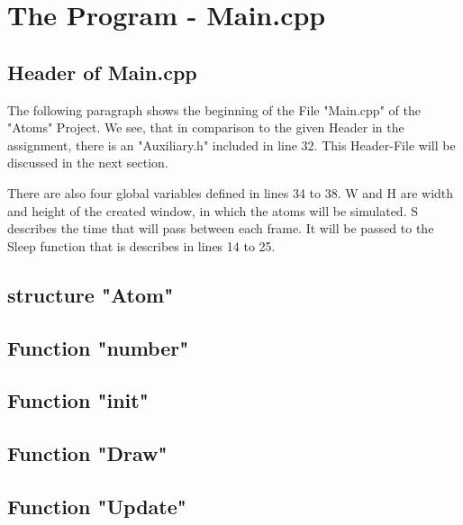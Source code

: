 \documentclass[11pt,titlepage]{article}
\def\ContinueLineNumber{\lstset{firstnumber=last}}
\begin{document}
\newpage			
	\section{The Program - Main.cpp}	
		\subsection{Header of Main.cpp}
			The following paragraph shows the beginning of the File "Main.cpp" of the "Atoms" Project. 
			We see, that in comparison to the given Header in the assignment, there is an "Auxiliary.h" included in line 32. This Header-File will be discussed in the next section.
			
			There are also four global variables defined in lines 34 to 38. W and H are width and height of the created window, in which the atoms will be simulated.
			S describes the time that will pass between each frame. It will be passed to the Sleep function that is describes in lines 14 to 25.
			
			
			
		\subsection{structure "Atom"}	
			\ContinueLineNumber
			
			
		\subsection{Function "number"}
			\ContinueLineNumber
			
			
		\subsection{Function "init"}
			\ContinueLineNumber
			
			
		\subsection{Function "Draw"}
			\ContinueLineNumber
			
\newpage
		\subsection{Function "Update"}
			\ContinueLineNumber
			
			
\end{document}
